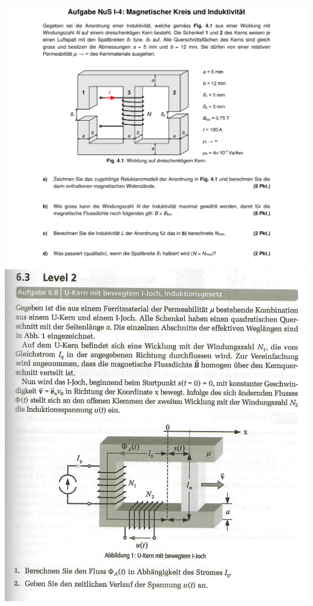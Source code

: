 \documentclass[a4paper, 8pt, landscape]{scrartcl} %
\begin{document}
\begin{multicols}{2}
    \vfill \null \columnbreak
    \includegraphics[width=\columnwidth]{img/a2.pdf} \\
  \vfill \null \columnbreak
  \includegraphics[width=\columnwidth]{img/induktion_1.PNG} \\
\vfill \null \columnbreak



\end{multicols}
\end{document}
